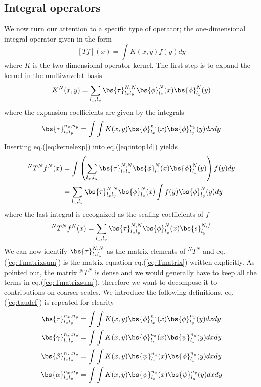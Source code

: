 \subsection{Integral operators}
We now turn our attention to a specific type of operator; the one-dimensional 
integral operator given in the form
\begin{equation}
	\label{eq:intop1d}
	[Tf](x) = \int K(x,y)f(y)dy
\end{equation}
where $K$ is the two-dimensional operator kernel. The first step is to expand
the kernel in the multiwavelet basis
\begin{equation}
	\label{eq:kernelexp}
	K^N(x,y) = \sum_{l_x,l_y}\bs{\tau}^{N,N}_{l_xl_y} 
	\bs{\phi}^N_{l_x}(x)\bs{\phi}^N_{l_y}(y)
\end{equation}
where the expansion coefficients are given by the integrals
\begin{equation}
	\label{eq:taudef}
	\bs{\tau}^{n_x,n_y}_{l_xl_y} = \int\int
	K(x,y)\bs{\phi}^{n_x}_{l_x}(x)\bs{\phi}^{n_y}_{l_y}(y)dxdy
\end{equation}
Inserting eq.(\ref{eq:kernelexp}) into eq.(\ref{eq:intop1d}) yields
\begin{align}
	\nonumber
	^NT^Nf^N(x) &= \int\left(\sum_{l_x,l_y} \bs{\tau}^{N,N}_{l_xl_y}
	\bs{\phi}^N_{l_x}(x)\bs{\phi}^N_{l_y}(y)\right)f(y)dy\\
	&= \sum_{l_x,l_y} \bs{\tau}^{N,N}_{l_xl_y}
	\bs{\phi}^N_{l_x}(x)\int f(y)\bs{\phi}^N_{l_y}(y)dy
\end{align}
where the last integral is recognized as the scaling coefficients of $f$
\begin{equation}
	\label{eq:Tmatrixsum}
	^NT^Nf^N(x) = \sum_{l_x,l_y} \bs{\tau}^{N,N}_{l_xl_y}
	\bs{\phi}^N_{l_x}(x)\bs{s}^{N,f}_{l_y}
\end{equation}
We can now identify $\bs{\tau}^{N,N}_{l_xl_y}$ as the matrix elements 
of $^NT^N$ and eq.(\ref{eq:Tmatrixsum}) is the matrix equation 
eq.(\ref{eq:Tmatrix}) written explicitly. As pointed out, the matrix $^NT^N$ is 
dense and we would generally have to keep all the terms in 
eq.(\ref{eq:Tmatrixsum}), therefore we want to decompose it to contributions on 
coarser scales. We introduce the following definitions, eq.(\ref{eq:taudef}) is 
repeated for clearity
\begin{align}
	\label{eq:tcbadef}
	\begin{split}
	\bs{\tau}^{n_x,n_y}_{l_xl_y} &= \int\int
	K(x,y)\bs{\phi}^{n_x}_{l_x}(x)\bs{\phi}^{n_y}_{l_y}(y)dxdy\\
	\bs{\gamma}^{n_x,n_y}_{l_xl_y} &= \int\int
	K(x,y)\bs{\phi}^{n_x}_{l_x}(x)\bs{\psi}^{n_y}_{l_y}(y)dxdy\\
	\bs{\beta}^{n_x,n_y}_{l_xl_y} &= \int\int
	K(x,y)\bs{\psi}^{n_x}_{l_x}(x)\bs{\phi}^{n_y}_{l_y}(y)dxdy\\
	\bs{\alpha}^{n_x,n_y}_{l_xl_y} &= \int\int
	K(x,y)\bs{\psi}^{n_x}_{l_x}(x)\bs{\psi}^{n_y}_{l_y}(y)dxdy
	\end{split}
\end{align}
